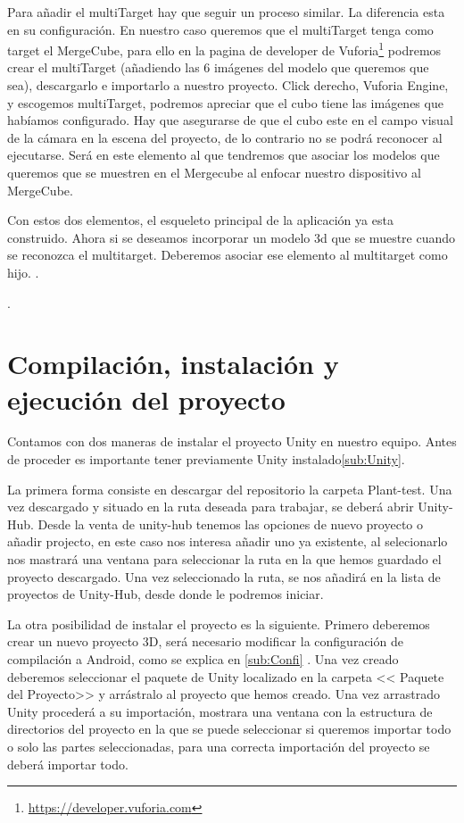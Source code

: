 Para añadir el multiTarget hay que seguir un proceso similar. La diferencia esta en su configuración. En nuestro caso queremos que el multiTarget tenga como target el MergeCube, para ello en la pagina de developer de Vuforia\footnote{\url{https://developer.vuforia.com}} podremos crear el multiTarget (añadiendo las 6 imágenes del modelo que queremos que sea), descargarlo e importarlo a nuestro proyecto. 
Click derecho, Vuforia Engine, y escogemos multiTarget, podremos apreciar que el cubo tiene las imágenes que habíamos configurado. Hay que asegurarse de que el cubo este en el campo visual de la cámara en la escena del proyecto, de lo contrario no se podrá reconocer al ejecutarse. Será en este elemento al que tendremos que asociar los modelos que queremos que se muestren en el Mergecube al enfocar nuestro dispositivo al MergeCube.


Con estos dos elementos, el esqueleto principal de la aplicación ya esta construido. Ahora si se deseamos incorporar un modelo 3d que se muestre cuando se reconozca el multitarget. Deberemos asociar ese elemento al multitarget como hijo.
.

.



\section{Compilación, instalación y ejecución del proyecto}
Contamos con dos maneras de instalar el proyecto Unity en nuestro equipo. Antes de proceder es importante tener previamente Unity instalado\ref{sub:Unity}.


La primera forma consiste en descargar del repositorio la carpeta Plant-test. Una vez descargado y situado en la ruta deseada para trabajar, se deberá abrir Unity-Hub. Desde la venta de unity-hub tenemos las opciones de nuevo proyecto o añadir projecto, en este caso nos interesa añadir uno ya existente, al selecionarlo nos mastrará una ventana para seleccionar la ruta en la que hemos guardado el proyecto descargado. Una vez seleccionado la ruta, se nos añadirá en la lista de proyectos de Unity-Hub, desde donde le podremos iniciar. 


La otra posibilidad de instalar el proyecto es la siguiente. Primero deberemos crear un nuevo proyecto 3D, será necesario modificar la configuración de compilación a Android, como se explica en \ref{sub:Confi} . Una vez creado deberemos seleccionar el paquete de Unity localizado en la carpeta << Paquete del Proyecto>> y arrástralo al proyecto que hemos creado. Una vez arrastrado Unity procederá a su importación, mostrara una ventana con la estructura de directorios del proyecto en la que se puede seleccionar si queremos importar todo o solo las partes seleccionadas, para una correcta importación del proyecto se deberá importar todo.


